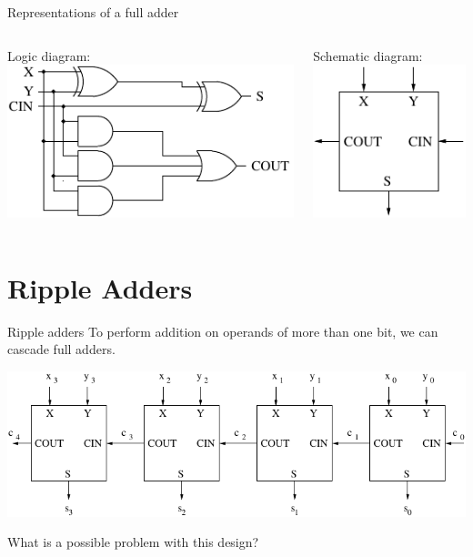 \begin{frame}{Representations of a full adder}
  \begin{columns}
    \begin{column}{6cm}
      \begin{center}
        Logic diagram:\\
        \includegraphics{FullAdderLogic}
      \end{center}
    \end{column}
    \begin{column}{6cm}
      \begin{center}
        Schematic diagram:\\
        \includegraphics{FullAdderSchematic}
      \end{center}
    \end{column}
  \end{columns}
\end{frame}

\section{Ripple Adders}

\begin{frame}{Ripple adders}
  To perform addition on operands of more than one bit, we can cascade full adders.
  \begin{center}
    \includegraphics[scale=0.8]{RippleAdderSchematic}
  \end{center}
  What is a possible problem with this design?
\end{frame}

